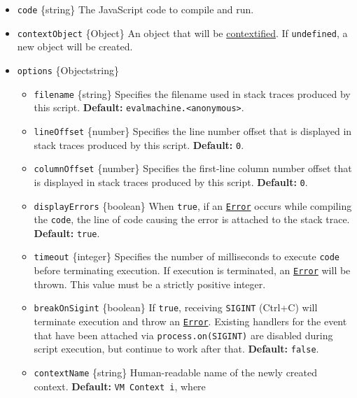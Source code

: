 \begin{itemize}
\tightlist
\item
  \texttt{code} \{string\} The JavaScript code to compile and run.
\item
  \texttt{contextObject} \{Object\} An object that will be
  \hyperref[what-does-it-mean-to-contextify-an-object]{contextified}. If
  \texttt{undefined}, a new object will be created.
\item
  \texttt{options} \{Object\textbar string\}

  \begin{itemize}
  \tightlist
  \item
    \texttt{filename} \{string\} Specifies the filename used in stack
    traces produced by this script. \textbf{Default:}
    \texttt{\textquotesingle{}evalmachine.\textless{}anonymous\textgreater{}\textquotesingle{}}.
  \item
    \texttt{lineOffset} \{number\} Specifies the line number offset that
    is displayed in stack traces produced by this script.
    \textbf{Default:} \texttt{0}.
  \item
    \texttt{columnOffset} \{number\} Specifies the first-line column
    number offset that is displayed in stack traces produced by this
    script. \textbf{Default:} \texttt{0}.
  \item
    \texttt{displayErrors} \{boolean\} When \texttt{true}, if an
    \href{errors.md\#class-error}{\texttt{Error}} occurs while compiling
    the \texttt{code}, the line of code causing the error is attached to
    the stack trace. \textbf{Default:} \texttt{true}.
  \item
    \texttt{timeout} \{integer\} Specifies the number of milliseconds to
    execute \texttt{code} before terminating execution. If execution is
    terminated, an \href{errors.md\#class-error}{\texttt{Error}} will be
    thrown. This value must be a strictly positive integer.
  \item
    \texttt{breakOnSigint} \{boolean\} If \texttt{true}, receiving
    \texttt{SIGINT} (Ctrl+C) will terminate execution and throw an
    \href{errors.md\#class-error}{\texttt{Error}}. Existing handlers for
    the event that have been attached via
    \texttt{process.on(\textquotesingle{}SIGINT\textquotesingle{})} are
    disabled during script execution, but continue to work after that.
    \textbf{Default:} \texttt{false}.
  \item
    \texttt{contextName} \{string\} Human-readable name of the newly
    created context. \textbf{Default:}
    \texttt{\textquotesingle{}VM\ Context\ i\textquotesingle{}}, where

\end{itemize}
\end{itemize}

